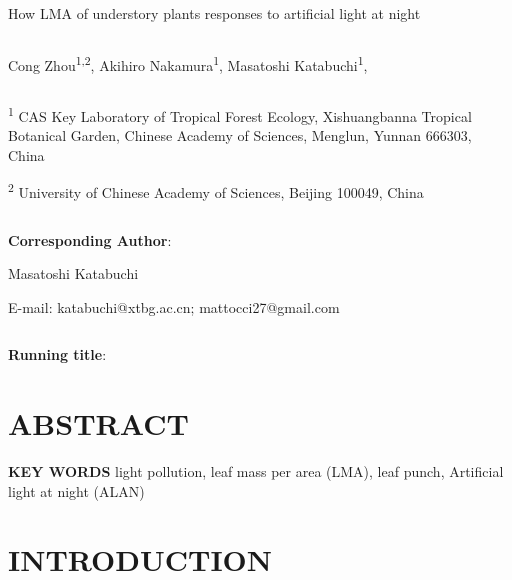 \documentclass[
  letterpaper,
  DIV=11,
  numbers=noendperiod]{scrartcl}
\author{}
\date{}
\begin{document}
\ifdefined\Shaded\renewenvironment{Shaded}{\begin{tcolorbox}[borderline west={3pt}{0pt}{shadecolor}, enhanced, breakable, boxrule=0pt, interior hidden, sharp corners, frame hidden]}{\end{tcolorbox}}\fi

\newpage

How LMA of understory plants responses to artificial light at night

\[ \]

Cong Zhou\textsuperscript{1,2}, Akihiro Nakamura\textsuperscript{1},
Masatoshi Katabuchi\textsuperscript{1},

\[ \]

\textsuperscript{1} CAS Key Laboratory of Tropical Forest Ecology,
Xishuangbanna Tropical Botanical Garden, Chinese Academy of Sciences,
Menglun, Yunnan 666303, China

\textsuperscript{2} University of Chinese Academy of Sciences, Beijing
100049, China

\[ \]

\textbf{Corresponding Author}:

Masatoshi Katabuchi

E-mail: katabuchi@xtbg.ac.cn; mattocci27@gmail.com

\[ \]

\textbf{Running title}:

\newpage

\hypertarget{abstract}{%
\section{ABSTRACT}\label{abstract}}

\textbf{KEY WORDS} light pollution, leaf mass per area (LMA), leaf
punch, Artificial light at night (ALAN)

\hypertarget{introduction}{%
\section{INTRODUCTION}\label{introduction}}
\end{document}
